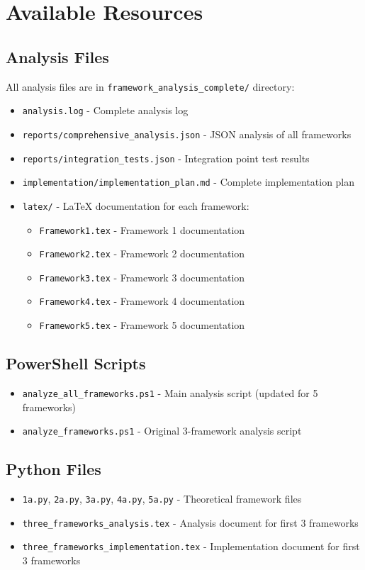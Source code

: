 \documentclass[12pt]{article}
\begin{document}
\section{Available Resources}

\subsection{Analysis Files}
All analysis files are in \texttt{framework\_analysis\_complete/} directory:

\begin{itemize}
    \item \texttt{analysis.log} - Complete analysis log
    \item \texttt{reports/comprehensive\_analysis.json} - JSON analysis of all frameworks
    \item \texttt{reports/integration\_tests.json} - Integration point test results
    \item \texttt{implementation/implementation\_plan.md} - Complete implementation plan
    \item \texttt{latex/} - LaTeX documentation for each framework:
    \begin{itemize}
        \item \texttt{Framework1.tex} - Framework 1 documentation
        \item \texttt{Framework2.tex} - Framework 2 documentation
        \item \texttt{Framework3.tex} - Framework 3 documentation
        \item \texttt{Framework4.tex} - Framework 4 documentation
        \item \texttt{Framework5.tex} - Framework 5 documentation
    \end{itemize}
\end{itemize}

\subsection{PowerShell Scripts}
\begin{itemize}
    \item \texttt{analyze\_all\_frameworks.ps1} - Main analysis script (updated for 5 frameworks)
    \item \texttt{analyze\_frameworks.ps1} - Original 3-framework analysis script
\end{itemize}

\subsection{Python Files}
\begin{itemize}
    \item \texttt{1a.py}, \texttt{2a.py}, \texttt{3a.py}, \texttt{4a.py}, \texttt{5a.py} - Theoretical framework files
    \item \texttt{three\_frameworks\_analysis.tex} - Analysis document for first 3 frameworks
    \item \texttt{three\_frameworks\_implementation.tex} - Implementation document for first 3 frameworks
\end{itemize}
\end{document}
